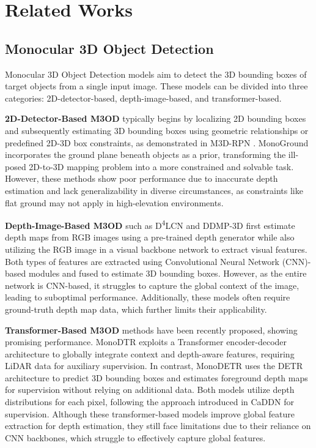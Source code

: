 \section{Related Works}
\label{sec:relatedworks}

\subsection{Monocular 3D Object Detection}
Monocular 3D Object Detection models aim to detect the 3D bounding boxes of target objects from a single input image. These models can be divided into three categories: 2D-detector-based, depth-image-based, and transformer-based.

\textbf{2D-Detector-Based M3OD} typically begins by localizing 2D bounding boxes and subsequently estimating 3D bounding boxes using geometric relationships or predefined 2D-3D box constraints, as demonstrated in M3D-RPN \cite{brazil2019m3d}.
MonoGround \cite{qin2022monoground} incorporates the ground plane beneath objects as a prior, transforming the ill-posed 2D-to-3D mapping problem into a more constrained and solvable task. However, these methods show poor performance due to inaccurate depth estimation and lack generalizability in diverse circumstances, as constraints like flat ground may not apply in high-elevation environments.

\textbf{Depth-Image-Based M3OD} such as D\textsuperscript{4}LCN \cite{ding2020learning} and DDMP-3D \cite{wang2021depth} first estimate depth maps from RGB images using a pre-trained depth generator while also utilizing the RGB image in a visual backbone network to extract visual features. Both types of features are extracted using Convolutional Neural Network (CNN)-based modules and fused to estimate 3D bounding boxes. 
However, as the entire network is CNN-based, it struggles to capture the global context of the image, leading to suboptimal performance. Additionally, these models often require ground-truth depth map data, which further limits their applicability.

\textbf{Transformer-Based M3OD} methods have been recently proposed, showing promising performance. MonoDTR \cite{huang2022monodtr} exploits a Transformer \cite{vaswani2017attention} encoder-decoder architecture to globally integrate context and depth-aware features, requiring LiDAR data for auxiliary supervision. In contrast, MonoDETR \cite{zhang2023monodetr} uses the DETR \cite{carion2020end} architecture to predict 3D bounding boxes and estimates foreground depth maps for supervision without relying on additional data. Both models utilize depth distributions for each pixel, following the approach introduced in CaDDN \cite{reading2021categorical} for supervision. Although these transformer-based models improve global feature extraction for depth estimation, they still face limitations due to their reliance on CNN backbones, which struggle to effectively capture global features.

